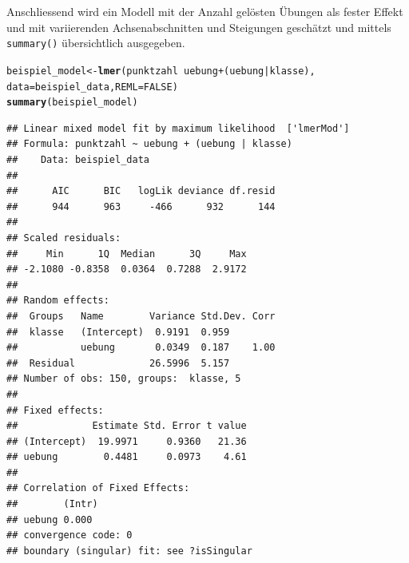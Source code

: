 \documentclass[12pt]{article}\usepackage[]{graphicx}\usepackage[]{color}
\makeatletter
\newcommand{\hlnum}[1]{\textcolor[rgb]{0.686,0.059,0.569}{#1}}%
\newcommand{\hlopt}[1]{\textcolor[rgb]{0,0,0}{#1}}%
\newcommand{\hlstd}[1]{\textcolor[rgb]{0.345,0.345,0.345}{#1}}%
\newcommand{\hlkwb}[1]{\textcolor[rgb]{0.69,0.353,0.396}{#1}}%
\newcommand{\hlkwc}[1]{\textcolor[rgb]{0.333,0.667,0.333}{#1}}%
\newcommand{\hlkwd}[1]{\textcolor[rgb]{0.737,0.353,0.396}{\textbf{#1}}}%
\newenvironment{kframe}{%
 \def\at@end@of@kframe{}%
 \ifinner\ifhmode%
  \def\at@end@of@kframe{\end{minipage}}%
  \begin{minipage}{\columnwidth}%
 \fi\fi%
 \def\FrameCommand##1{\hskip\@totalleftmargin \hskip-\fboxsep
 \colorbox{shadecolor}{##1}\hskip-\fboxsep
     \hskip-\linewidth \hskip-\@totalleftmargin \hskip\columnwidth}%
 \MakeFramed {\advance\hsize-\width
   \@totalleftmargin\z@ \linewidth\hsize
   \@setminipage}}%
 {\par\unskip\endMakeFramed%
 \at@end@of@kframe}
\newenvironment{knitrout}{}{} %
\makeatother
\begin{document}
Anschliessend wird ein Modell mit der Anzahl gelösten Übungen als fester Effekt und mit variierenden Achsenabschnitten und Steigungen geschätzt und mittels \texttt{summary()} übersichtlich ausgegeben.

\singlespacing
\begin{knitrout}
\color{fgcolor}\begin{kframe}
\begin{alltt}
\hlstd{beispiel_model} \hlkwb{<-} \hlkwd{lmer}\hlstd{(punktzahl} \hlopt{~} \hlstd{uebung} \hlopt{+} \hlstd{(uebung} \hlopt{|} \hlstd{klasse),}
    \hlkwc{data} \hlstd{= beispiel_data,} \hlkwc{REML} \hlstd{=} \hlnum{FALSE}\hlstd{)}
\hlkwd{summary}\hlstd{(beispiel_model)}
\end{alltt}
\begin{verbatim}
## Linear mixed model fit by maximum likelihood  ['lmerMod']
## Formula: punktzahl ~ uebung + (uebung | klasse)
##    Data: beispiel_data
## 
##      AIC      BIC   logLik deviance df.resid 
##      944      963     -466      932      144 
## 
## Scaled residuals: 
##     Min      1Q  Median      3Q     Max 
## -2.1080 -0.8358  0.0364  0.7288  2.9172 
## 
## Random effects:
##  Groups   Name        Variance Std.Dev. Corr
##  klasse   (Intercept)  0.9191  0.959        
##           uebung       0.0349  0.187    1.00
##  Residual             26.5996  5.157        
## Number of obs: 150, groups:  klasse, 5
## 
## Fixed effects:
##             Estimate Std. Error t value
## (Intercept)  19.9971     0.9360   21.36
## uebung        0.4481     0.0973    4.61
## 
## Correlation of Fixed Effects:
##        (Intr)
## uebung 0.000 
## convergence code: 0
## boundary (singular) fit: see ?isSingular
\end{verbatim}
\end{kframe}
\end{knitrout}
\end{document}
